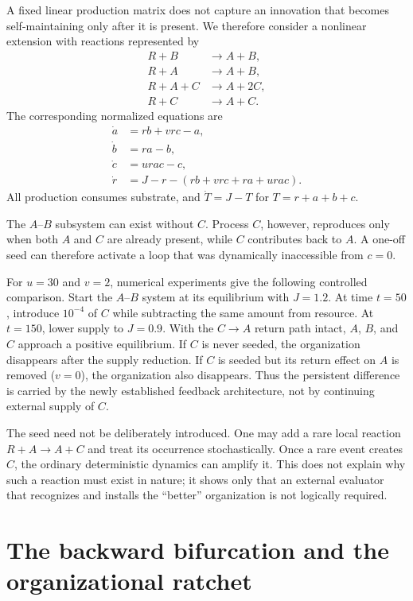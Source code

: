 \documentclass[11pt]{article}
\begin{document}
A fixed linear production matrix does not capture an innovation that becomes self-maintaining only after it is present. We therefore consider a nonlinear extension with reactions represented by
\begin{align*}
R+B&\to A+B,\\
R+A&\to A+B,\\
R+A+C&\to A+2C,\\
R+C&\to A+C.
\end{align*}
The corresponding normalized equations are
\begin{align}
\dot a &= rb+vrc-a,\\
\dot b &= ra-b,\\
\dot c &= urac-c,\\
\dot r &= J-r-(rb+vrc+ra+urac).
\label{eq:seed}
\end{align}
All production consumes substrate, and $\dot T=J-T$ for $T=r+a+b+c$.

The $A$--$B$ subsystem can exist without $C$. Process $C$, however, reproduces only when both $A$ and $C$ are already present, while $C$ contributes back to $A$. A one-off seed can therefore activate a loop that was dynamically inaccessible from $c=0$.

For $u=30$ and $v=2$, numerical experiments give the following controlled comparison. Start the $A$--$B$ system at its equilibrium with $J=1.2$. At time $t=50$, introduce $10^{-4}$ of $C$ while subtracting the same amount from resource. At $t=150$, lower supply to $J=0.9$. With the $C\to A$ return path intact, $A$, $B$, and $C$ approach a positive equilibrium. If $C$ is never seeded, the organization disappears after the supply reduction. If $C$ is seeded but its return effect on $A$ is removed ($v=0$), the organization also disappears. Thus the persistent difference is carried by the newly established feedback architecture, not by continuing external supply of $C$.

The seed need not be deliberately introduced. One may add a rare local reaction $R+A\to A+C$ and treat its occurrence stochastically. Once a rare event creates $C$, the ordinary deterministic dynamics can amplify it. This does not explain why such a reaction must exist in nature; it shows only that an external evaluator that recognizes and installs the ``better'' organization is not logically required.

\section{The backward bifurcation and the organizational ratchet}
\end{document}
